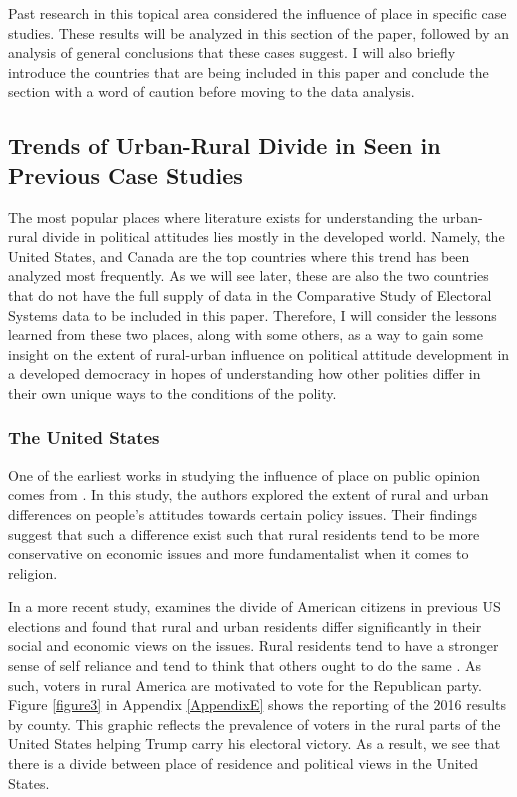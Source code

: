 \documentclass[12pt, titlepage]{article}
\begin{document}
Past research in this topical area considered the influence of place in specific case studies. These results will be analyzed in this section of the paper, followed by an analysis of general conclusions that these cases suggest. I will also briefly introduce the countries that are being included in this paper and conclude the section with a word of caution before moving to the data analysis. 

\subsection{Trends of Urban-Rural Divide in Seen in Previous Case Studies}

The most popular places where literature exists for understanding the urban-rural divide in political attitudes lies mostly in the developed world. Namely, the United States, and Canada are the top countries where this trend has been analyzed most frequently. As we will see later, these are also the two countries that do not have the full supply of data in the Comparative Study of Electoral Systems data to be included in this paper. Therefore, I will consider the lessons learned from these two places, along with some others, as a way to gain some insight on the extent of rural-urban influence on political attitude development in a developed democracy in hopes of understanding how other polities differ in their own unique ways to the conditions of the polity.

\subsubsection{The United States}

One of the earliest works in studying the influence of place on public opinion comes from \cite{glenn_rural-urban_1967}. In this study, the authors explored the extent of rural and urban differences on people's attitudes towards certain policy issues. Their findings suggest that such a difference exist such that rural residents tend to be more conservative on economic issues and more fundamentalist when it comes to religion.

In a more recent study, \cite{gimpel_rural_2006} examines the divide of American citizens in previous US elections and found that rural and urban residents differ significantly in their social and economic views on the issues. Rural residents tend to have a stronger sense of self reliance and tend to think that others ought to do the same \citep{walsh_putting_2012}. As such, voters in rural America are motivated to vote for the Republican party. Figure \ref{figure3} in Appendix \ref{AppendixE} shows the \cite{NYT-trump} reporting of the 2016 results by county. This graphic reflects the prevalence of voters in the rural parts of the United States helping Trump carry his electoral victory. As a result, we see that there is a divide between place of residence and political views in the United States.
\end{document}
